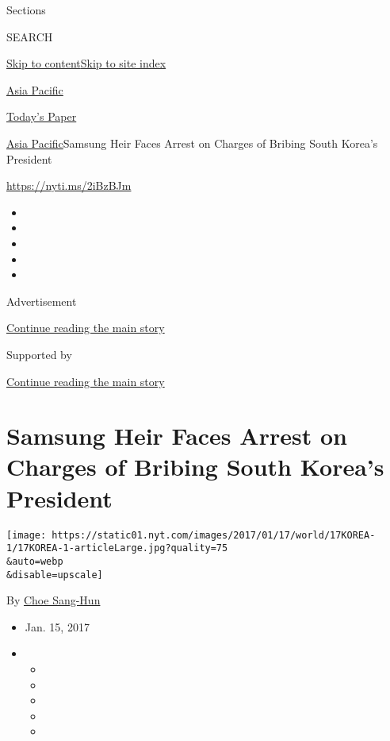Sections

SEARCH

\protect\hyperlink{site-content}{Skip to
content}\protect\hyperlink{site-index}{Skip to site index}

\href{https://www.nytimes.com/section/world/asia}{Asia Pacific}

\href{https://myaccount.nytimes.com/auth/login?response_type=cookie\&client_id=vi}{}

\href{https://www.nytimes.com/section/todayspaper}{Today's Paper}

\href{/section/world/asia}{Asia Pacific}\textbar{}Samsung Heir Faces
Arrest on Charges of Bribing South Korea's President

\url{https://nyti.ms/2iBzBJm}

\begin{itemize}
\item
\item
\item
\item
\item
\end{itemize}

Advertisement

\protect\hyperlink{after-top}{Continue reading the main story}

Supported by

\protect\hyperlink{after-sponsor}{Continue reading the main story}

\hypertarget{samsung-heir-faces-arrest-on-charges-of-bribing-south-koreas-president}{%
\section{Samsung Heir Faces Arrest on Charges of Bribing South Korea's
President}\label{samsung-heir-faces-arrest-on-charges-of-bribing-south-koreas-president}}

\texttt{[image: https://static01.nyt.com/images/2017/01/17/world/17KOREA-1/17KOREA-1-articleLarge.jpg?quality=75\\\&auto=webp\\\&disable=upscale]}

By \href{http://www.nytimes.com/by/choe-sang-hun}{Choe Sang-Hun}

\begin{itemize}
\item
  Jan. 15, 2017
\item
  \begin{itemize}
  \item
  \item
  \item
  \item
  \item
  \end{itemize}
\end{itemize}

